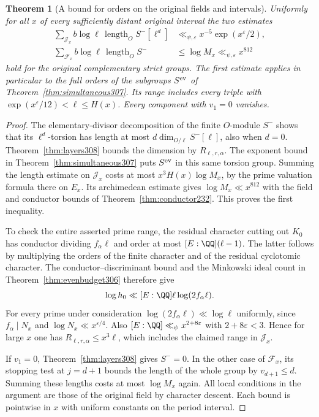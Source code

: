 \documentclass[a4paper,11pt]{article}
\newtheorem{theorem}[proposition]{Theorem}
\theoremstyle{definition}
\theoremstyle{remark}
\numberwithin{equation}{section}
\begin{document}
\begin{theorem}[A bound for orders on the original fields and intervals]\leavevmode
\label{thm:orders308}
Uniformly for all \(x\) of every sufficiently distant original
interval the two estimates
\[
 \begin{split}
 \sum_{\mathcal J_x} b\log\ell\,
       \operatorname{length}_O S^-[\ell^d]
      &\ll_{\psi,\varepsilon} x^{-5}\exp(x^\varepsilon/2),\\
 \sum_{\mathcal F_x} b\log\ell\,\operatorname{length}_O S^-
      &\le \log M_x\ll_{\psi,\varepsilon} x^{812}
 \end{split}
\]
hold for the original complementary strict groups. The first
estimate applies in particular to the full orders of the
subgroups \(S^{\rm ev}\) of
Theorem~\ref{thm:simultaneous307}. Its range includes every
triple with
\(\exp(x^\varepsilon/12)<\ell\le H(x)\).
Every component with \(v_1=0\) vanishes.
\end{theorem}
\begin{proof}
The elementary-divisor decomposition of the finite \(O\)-module
\(S^-\) shows that its \(\ell^d\)-torsion has length at most
\(d\dim_{O/\ell}S^-[\ell]\), also when \(d=0\). Theorem~\ref{thm:layers308}
bounds the dimension by \(R_{\ell,r,\alpha}\).
The exponent bound in Theorem~\ref{thm:simultaneous307}
puts \(S^{\rm ev}\) in this same torsion group. Summing the
length estimate on \(\mathcal J_x\) costs at most
\(x^3H(x)\log M_x\), by the prime valuation formula there
on \(E_x\). Its archimedean estimate gives
\(\log M_x\ll x^{812}\) with the field and conductor bounds
of Theorem~\ref{thm:conductor232}. This proves the first
inequality.

To check the entire asserted prime range, the residual
character cutting out \(K_0\) has conductor dividing
\(f_\alpha\ell\) and order at most
\([E:\QQ](\ell-1)\). The latter follows by multiplying
the orders of the finite character and of the residual
cyclotomic character. The conductor--discriminant bound
and the Minkowski ideal count in Theorem~\ref{thm:evenbudget306}
therefore give
\[
      \log h_0\ll [E:\QQ]\ell\log(2f_\alpha\ell).
\]
For every prime under consideration
\(\log(2f_\alpha\ell)\ll\log\ell\) uniformly, since
\(f_\alpha\mid N_x\) and \(\log N_x\ll x^{\varepsilon/4}\).
Also \([E:\QQ]\ll_\psi x^{2+8\varepsilon}\) with
\(2+8\varepsilon<3\). Hence for large \(x\) one has
\(R_{\ell,r,\alpha}\le x^3\ell\), which includes the
claimed range in \(\mathcal J_x\).

If \(v_1=0\), Theorem~\ref{thm:layers308} gives \(S^-=0\).
In the other case of \(\mathcal F_x\), its stopping test at
\(j=d+1\) bounds the length of the whole group by \(v_{d+1}\le d\).
Summing these lengths costs at most \(\log M_x\) again.
All local conditions in the argument are those of the
original field by character descent. Each bound is pointwise
in \(x\) with uniform constants on the period interval.
\end{proof}
\end{document}
